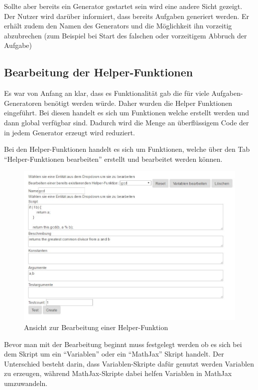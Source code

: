 Sollte aber bereits ein Generator gestartet sein wird eine andere Sicht gezeigt. Der Nutzer wird darüber informiert, dass bereits Aufgaben generiert werden. Er erhält zudem den Namen des Generators und die Möglichkeit ihn vorzeitig abzubrechen (zum Beispiel bei Start des falschen oder vorzeitigem Abbruch der Aufgabe)


\subsection{Bearbeitung der Helper-Funktionen} \label{EditGenerator}

Es war von Anfang an klar, dass es Funktionalität gab die für viele Aufgaben-Generatoren benötigt werden würde. Daher wurden die Helper Funktionen eingeführt. Bei diesen handelt es sich um Funktionen welche erstellt werden und dann global verfügbar sind. Dadurch wird die Menge an überflüssigem Code der in jedem Generator erzeugt wird reduziert.

Bei den Helper-Funktionen handelt es sich um Funktionen, welche über den Tab ``Helper-Funktionen bearbeiten'' erstellt und bearbeitet werden können. \\

\begin{figure}[htp]     %
\centering
\includegraphics[width=1\textwidth]{bilder/EditHelper} 
\caption[Ansicht zur Bearbeitung einer Helper-Funktion]{Ansicht zur Bearbeitung einer Helper-Funktion}
\end{figure} 

Bevor man mit der Bearbeitung beginnt muss festgelegt werden ob es sich bei dem Skript um ein ``Variablen'' oder ein ``MathJax'' Skript handelt. Der Unterschied besteht darin, dass Variablen-Skripte dafür genutzt werden Variablen zu erzeugen, während MathJax-Skripte dabei helfen Variablen in MathJax umzuwandeln.

